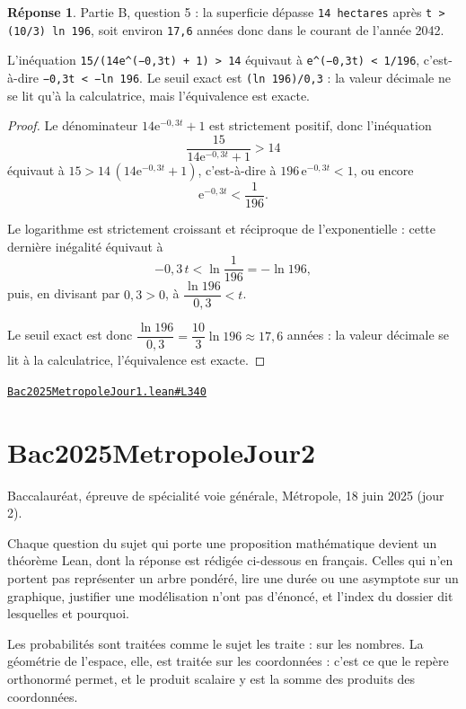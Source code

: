 \documentclass[11pt,a4paper]{article}
\theoremstyle{definition}
\theoremstyle{plain}
\theoremstyle{definition}
\newtheorem*{reponse}{Réponse}
\newcommand{\source}[2]{\par\smallskip\noindent\hfill{\footnotesize\href{#1}{\texttt{#2}}}\par\smallskip}
\begin{document}
\begin{reponse}
Partie B, question 5 : la superficie dépasse \texttt{14 hectares} après
\texttt{t > (10/3) ln 196}, soit environ \texttt{17,6} années \textemdash{} donc dans le courant de l'année
2042.

L'inéquation \texttt{15/(14e\textasciicircum{}(−0,3t) + 1) > 14} équivaut à \texttt{e\textasciicircum{}(−0,3t) < 1/196}, c'est-à-dire
\texttt{−0,3t < −ln 196}. Le seuil exact est \texttt{(ln 196)/0,3} : la valeur décimale ne se lit
qu'à la calculatrice, mais l'équivalence est exacte.
\end{reponse}
\begin{proof}
Le dénominateur $14\mathrm{e}^{-0{,}3t} + 1$ est strictement positif, donc l'inéquation
\[ \frac{15}{14\mathrm{e}^{-0{,}3t} + 1} > 14 \]
équivaut à $15 > 14\,(14\mathrm{e}^{-0{,}3t} + 1)$, c'est-à-dire à
$196\,\mathrm{e}^{-0{,}3t} < 1$, ou encore
\[ \mathrm{e}^{-0{,}3t} < \frac{1}{196} . \]

Le logarithme est strictement croissant et réciproque de l'exponentielle : cette dernière
inégalité équivaut à
\[ -0{,}3\,t < \ln\frac{1}{196} = -\ln 196 , \]
puis, en divisant par $0{,}3 > 0$, à $\dfrac{\ln 196}{0{,}3} < t$.

Le seuil exact est donc $\dfrac{\ln 196}{0{,}3} = \dfrac{10}{3}\ln 196 \approx 17{,}6$
années : la valeur décimale se lit à la calculatrice, l'équivalence est exacte.
\end{proof}
\source{https://github.com/Commutator-IO/learn-lean/blob/main/exams/2025/Bac2025MetropoleJour1.lean\#L340}{Bac2025MetropoleJour1.lean\#L340}

\section{Bac2025MetropoleJour2}

\noindent
Baccalauréat, épreuve de spécialité \textemdash{} voie générale, Métropole, 18 juin 2025 (jour 2).

Chaque question du sujet qui porte une proposition mathématique devient un théorème
Lean, dont la réponse est rédigée ci-dessous en français. Celles qui n'en portent pas \textemdash{} représenter un arbre pondéré, lire une durée
ou une asymptote sur un graphique, justifier une modélisation \textemdash{} n'ont pas d'énoncé, et
l'index du dossier dit lesquelles et pourquoi.

Les probabilités sont traitées comme le sujet les traite : sur les nombres. La
géométrie de l'espace, elle, est traitée sur les coordonnées : c'est ce que le repère
orthonormé permet, et le produit scalaire y est la somme des produits des coordonnées.
\end{document}
